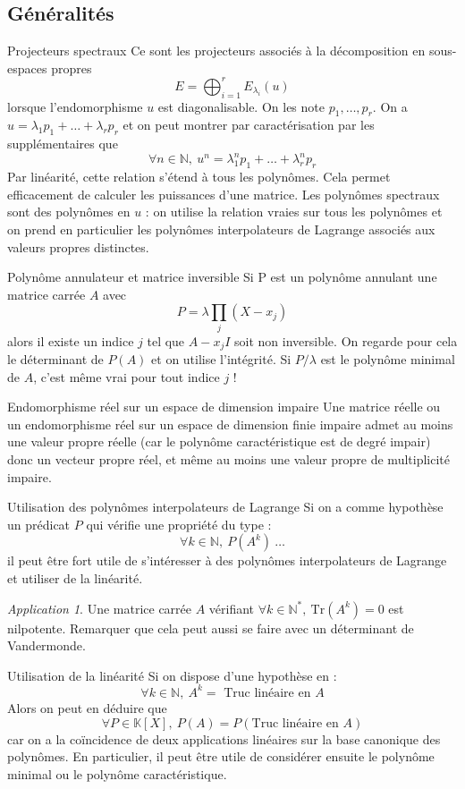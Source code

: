 \documentclass[french]{book}
\newcommand{\N}{\mathbb{N}}
\newcommand{\K}{\mathbb{K}}
\newcommand{\st}{^*}
\newcommand{\Tr}{\text{Tr}}
\theoremstyle{plain}
\theoremstyle{definition}
\theoremstyle{remark}
\newtheorem*{app}{Application}
\begin{document}
\subsection{Généralités}
\begin{AS}{Projecteurs spectraux} Ce sont les projecteurs associés à la décomposition en sous-espaces propres $$E=\bigoplus_{i=1}^rE_{\lambda_i}(u)$$ lorsque l'endomorphisme $u$ est diagonalisable. On les note $p_1,\ldots,p_r$. On a $u=\lambda_1p_1+\ldots+\lambda_rp_r$ et on peut montrer par caractérisation par les supplémentaires que $$\forall n\in\N,\ u^n=\lambda_1^np_1+\ldots+\lambda_r^np_r$$ Par linéarité, cette relation s'étend à tous les polynômes. Cela permet efficacement de calculer les puissances d'une matrice. Les polynômes spectraux sont des polynômes en $u$ : on utilise la relation vraies sur tous les polynômes et on prend en particulier les polynômes interpolateurs de Lagrange associés aux valeurs propres distinctes.
\end{AS}
\begin{AS}{Polynôme annulateur et matrice inversible} Si P est un polynôme annulant une matrice carrée $A$ avec $$P=\lambda\prod_j(X-x_j)$$alors il existe un indice $j$ tel que $A-x_jI$ soit non inversible. On regarde pour cela le déterminant de $P(A)$ et on utilise l’intégrité. Si $P/\lambda$ est le polynôme minimal de $A$, c’est même vrai pour tout indice $j$ !
\end{AS}
\begin{AS}{Endomorphisme réel sur un espace de dimension impaire} Une matrice réelle ou un endomorphisme réel sur un espace de dimension finie impaire admet au moins une valeur propre réelle (car le polynôme caractéristique est de degré impair) donc un vecteur propre réel, et même au moins une valeur propre de multiplicité impaire.
\end{AS}
\begin{AS}{Utilisation des polynômes interpolateurs de Lagrange} Si on a comme hypothèse un prédicat $P$ qui vérifie une propriété du type : $$\forall k\in\N,\ P(A^k)\ \ldots$$ il peut être fort utile de s'intéresser à des polynômes interpolateurs de Lagrange et utiliser de la linéarité.
\end{AS}
\begin{app}
	Une matrice carrée $A$ vérifiant $\forall k\in\N\st,\ \Tr(A^k)=0$ est nilpotente. Remarquer que cela peut aussi se faire avec un déterminant de Vandermonde.
\end{app}
\begin{AS}{Utilisation de la linéarité} Si on dispose d'une hypothèse en : $$\forall k\in\N,\ A^k = \text{ Truc linéaire en $A$}$$ Alors on peut en déduire que $$\forall P\in\K[X],\ P(A)=P(\text{Truc linéaire en $A$})$$ car on a la coïncidence de deux applications linéaires sur la base canonique des polynômes. En particulier, il peut être utile de considérer ensuite le polynôme minimal ou le polynôme caractéristique.
\end{AS}
\end{document}
